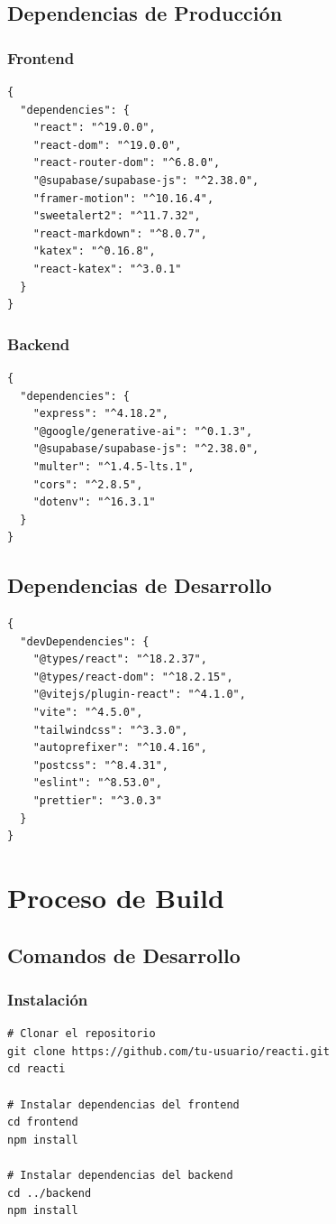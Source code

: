 \documentclass[12pt,a4paper]{report}
\begin{document}
\subsection{Dependencias de Producción}

\subsubsection{Frontend}
\begin{lstlisting}
{
  "dependencies": {
    "react": "^19.0.0",
    "react-dom": "^19.0.0",
    "react-router-dom": "^6.8.0",
    "@supabase/supabase-js": "^2.38.0",
    "framer-motion": "^10.16.4",
    "sweetalert2": "^11.7.32",
    "react-markdown": "^8.0.7",
    "katex": "^0.16.8",
    "react-katex": "^3.0.1"
  }
}
\end{lstlisting}

\subsubsection{Backend}
\begin{lstlisting}
{
  "dependencies": {
    "express": "^4.18.2",
    "@google/generative-ai": "^0.1.3",
    "@supabase/supabase-js": "^2.38.0",
    "multer": "^1.4.5-lts.1",
    "cors": "^2.8.5",
    "dotenv": "^16.3.1"
  }
}
\end{lstlisting}

\subsection{Dependencias de Desarrollo}

\begin{lstlisting}
{
  "devDependencies": {
    "@types/react": "^18.2.37",
    "@types/react-dom": "^18.2.15",
    "@vitejs/plugin-react": "^4.1.0",
    "vite": "^4.5.0",
    "tailwindcss": "^3.3.0",
    "autoprefixer": "^10.4.16",
    "postcss": "^8.4.31",
    "eslint": "^8.53.0",
    "prettier": "^3.0.3"
  }
}
\end{lstlisting}

\section{Proceso de Build}

\subsection{Comandos de Desarrollo}

\subsubsection{Instalación}
\begin{lstlisting}
# Clonar el repositorio
git clone https://github.com/tu-usuario/reacti.git
cd reacti

# Instalar dependencias del frontend
cd frontend
npm install

# Instalar dependencias del backend
cd ../backend
npm install
\end{lstlisting}
\end{document}
